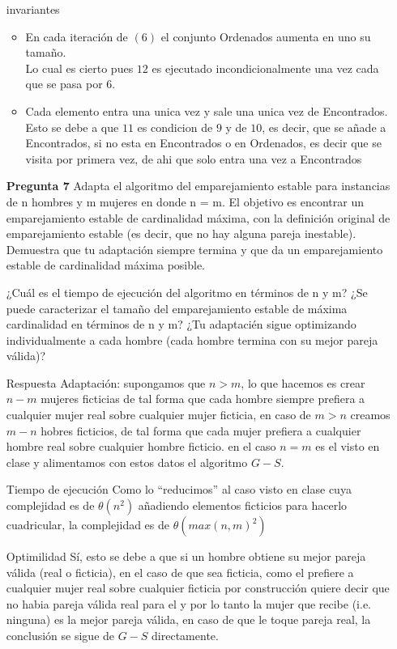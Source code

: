 \documentclass[12pt]{articlels
}
\begin{document}
\begin{itemize}
\item[invariantes]
  \begin{itemize}
 \item En cada iteración de $(6)$ el conjunto Ordenados aumenta en uno su tamaño.\\
   Lo cual es cierto pues $12$ es ejecutado incondicionalmente una vez cada que se pasa por $6$.
   \item Cada elemento entra una unica vez y sale una unica vez de Encontrados.\\
     Esto se debe a que $11$ es condicion de $9$ y de $10$, es decir, que se añade a Encontrados, si no esta en Encontrados o en Ordenados, es decir que se visita por primera vez, de ahi que solo entra una vez a Encontrados
   \end{itemize}


\item[\bf{Pregunta 7}] Adapta el algoritmo del emparejamiento estable para instancias de n hombres y m mujeres en donde n = m. El objetivo es encontrar un emparejamiento estable de cardinalidad máxima, con la definición original de emparejamiento estable (es decir, que no hay alguna pareja inestable). Demuestra que tu adaptación siempre termina y que da un emparejamiento estable de cardinalidad máxima posible.

¿Cuál es el tiempo de ejecución del algoritmo en términos de n y m?
¿Se puede caracterizar el tamaño del emparejamiento estable de máxima
cardinalidad en términos de n y m?
¿Tu adaptacién sigue optimizando individualmente a cada hombre (cada hombre termina con su mejor pareja válida)?

\item[Respuesta] Adaptación: supongamos que $n > m$, lo que hacemos es crear $n-m$ mujeres ficticias de tal forma que cada hombre siempre prefiera a cualquier mujer real sobre cualquier mujer ficticia, en caso de $m > n$ creamos $m-n$ hobres ficticios, de tal forma que cada mujer prefiera a cualquier hombre real sobre cualquier hombre ficticio. en el caso $n = m$ es el visto en clase y alimentamos con estos datos el algoritmo $G-S$.
\item[Tiempo de ejecución] Como lo ``reducimos'' al caso visto en clase cuya complejidad es de $\theta(n^2)$ añadiendo elementos ficticios para hacerlo cuadricular, la complejidad es de  $\theta(max(n,m)^2)$

\item[Optimilidad] Sí, esto se debe a que si un hombre obtiene su mejor pareja válida (real o ficticia), en el caso de que sea ficticia, como el prefiere a cualquier mujer real sobre cualquier ficticia por construcción quiere decir que no habia pareja válida real para el y por lo tanto la mujer que recibe (i.e. ninguna) es la mejor pareja válida, en caso de que le toque pareja real, la conclusión se sigue de $G-S$ directamente.


\end{itemize}
\end{document}
